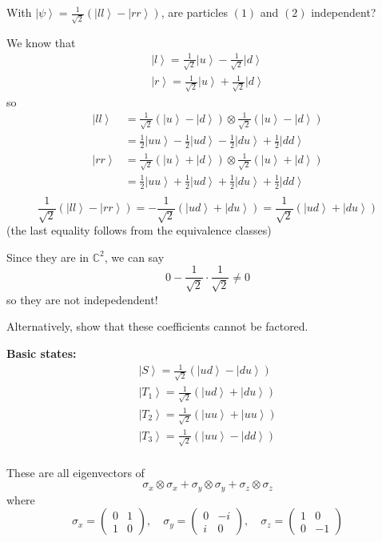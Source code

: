\documentclass[12pt]{article}
\newcommand{\C}{\mathbb{C}}
\newcommand{\ket}[1]{\left\vert #1 \right\rangle}
\begin{document}
    With $\ket \psi = \frac{1}{\sqrt 2}(\ket{ll} - \ket{rr})$, are particles $(1)$ and $(2)$ independent? 

    We know that 
    \begin{gather*}
        \ket l = \frac{1}{\sqrt 2} \ket u - \frac{1}{\sqrt 2}\ket d\\
        \ket r = \frac{1}{\sqrt 2} \ket u + \frac{1}{\sqrt 2}\ket d
    \end{gather*} 
    so 
    \begin{align*}
        \ket{ll} &= \frac{1}{\sqrt 2}(\ket u - \ket d) \otimes \frac{1}{\sqrt 2}(\ket u - \ket d)\\
        &= \frac{1}{2}\ket{uu} - \frac{1}{2}\ket{ud} - \frac{1}{2}\ket{du} + \frac{1}{2}\ket{dd}\\
        \ket{rr} &= \frac{1}{\sqrt 2}(\ket u + \ket d) \otimes \frac{1}{\sqrt 2}(\ket u + \ket d)\\
        &= \frac{1}{2}\ket{uu} + \frac{1}{2}\ket{ud} + \frac{1}{2}\ket{du} + \frac{1}{2}\ket{dd}\\
    \end{align*}
    \[\frac{1}{\sqrt 2}(\ket{ll} - \ket{rr}) = -\frac{1}{\sqrt 2}(\ket{ud} + \ket{du}) = \frac{1}{\sqrt 2}(\ket{ud} + \ket{du})\]
    (the last equality follows from the equivalence classes)

    Since they are in $\C^2$, we can say 
    \[0 - \frac{1}{\sqrt 2} \cdot \frac{1}{\sqrt 2} \neq 0\]
    so they are not indepedendent! 

    Alternatively, show that these coefficients cannot be factored. 

    \textbf{Basic states:}
    \begin{align*}
        \ket{S}= \frac{1}{\sqrt 2}(\ket{ud} - \ket{du})\\
        \ket{T_1}= \frac{1}{\sqrt 2}(\ket{ud} + \ket{du})\\
        \ket{T_2}= \frac{1}{\sqrt 2}(\ket{uu} + \ket{uu})\\
        \ket{T_3}= \frac{1}{\sqrt 2}(\ket{uu} - \ket{dd})\\
    \end{align*}

    These are all eigenvectors of 
    \[\sigma_x \otimes \sigma_x + \sigma_y \otimes \sigma_y + \sigma_z \otimes \sigma_z\]
    where 
    \[\sigma_x = \begin{pmatrix}
        0 & 1\\
        1 & 0
    \end{pmatrix}, \quad \sigma_y = \begin{pmatrix}
        0 & -i\\
        i & 0
    \end{pmatrix}, \quad \sigma_z = \begin{pmatrix}
        1 & 0\\
        0 & -1
    \end{pmatrix}\]
\end{document}
